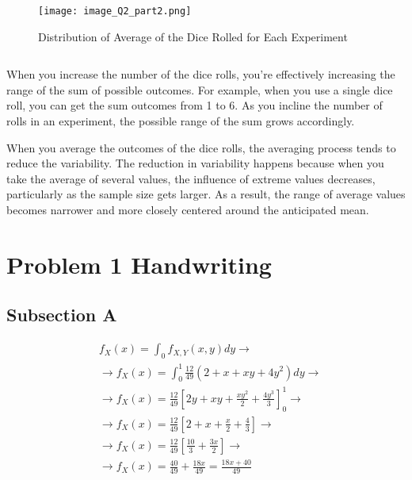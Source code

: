 \documentclass[a4paper,11pt]{article}
\theoremstyle{mytheor}
\begin{document}
\inputminted[breaklines]{python}{script_Q2_part2.py}
\begin{figure} [H]
    \centering
    \texttt{[image: image\_Q2\_part2.png]}
    \caption{Distribution of Average of the Dice Rolled for Each Experiment}
    \label{fig:enter-label}
\end{figure}

\inputminted[breaklines]{python}{script_Q2_part3.py}
When you increase the number of the dice rolls, you're effectively increasing the range of the sum of possible outcomes. For example, when you use a single dice roll, you can get the sum outcomes from 1 to 6. As you incline the number of rolls in an experiment, the possible range of the sum grows accordingly.

When you average the outcomes of the dice rolls, the averaging process tends to reduce the variability. The reduction in variability happens because when you take the average of several values, the influence of extreme values decreases, particularly as the sample size gets larger. As a result, the range of average values becomes narrower and more closely centered around the anticipated mean.

\newpage
\section{Problem 1 Handwriting}
\subsection{Subsection A}
$$
\begin{aligned}
& f_X(x)=\int_0 f_{X, Y}(x, y) d y \rightarrow \\
& \rightarrow f_X(x)=\int_0^1 \frac{12}{49}\left(2+x+x y+4 y^2\right) d y \rightarrow \\
& \rightarrow f_X(x)=\frac{12}{49}\left[2 y+x y+\frac{x y^2}{2}+\frac{4 y^3}{3}\right]_0^1 \rightarrow \\
& \rightarrow f_X(x)=\frac{12}{49}\left[2+x+\frac{x}{2}+\frac{4}{3}\right] \rightarrow \\
& \rightarrow f_X(x)=\frac{12}{49}\left[\frac{10}{3}+\frac{3 x}{2}\right] \rightarrow \\
& \rightarrow f_X(x)=\frac{40}{49}+\frac{18 x}{49}=\frac{18 x+40}{49} 
\end{aligned}
$$
\end{document}
